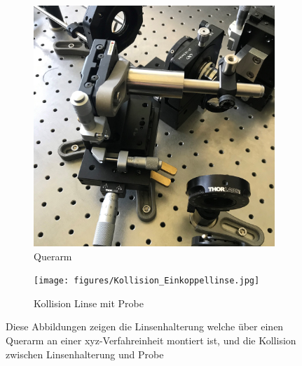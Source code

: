 \documentclass[titlepage]{article}
\begin{document}
		\begin{figure}
			\centering
			\begin{subfigure}[b]{0.4\textwidth}
				\centering
				\includegraphics[width=\textwidth]{figures/Einkoppellinse.jpg}
				\caption{Querarm}
				\label{fig:querarm}
			\end{subfigure}
			\hfill
			\begin{subfigure}[b]{0.4\textwidth}
				\centering
				\texttt{[image: figures/Kollision\_Einkoppellinse.jpg]}
				\caption{Kollision Linse mit Probe}
				\label{fig:kollision}
			\end{subfigure}
			\caption{Diese Abbildungen zeigen die Linsenhalterung welche über einen Querarm an einer xyz-Verfahreinheit montiert ist, und die Kollision zwischen Linsenhalterung und Probe}
			\label{fig:linsenhalterung}
		\end{figure}
\end{document}
